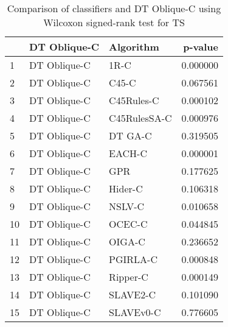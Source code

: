 \begin{table}
\footnotesize
\caption{Comparison of classifiers and DT Oblique-C using Wilcoxon signed-rank test for TS}
\label{tab:DT Oblique-C wilcoxon TS comparison}
\begin{tabular}{lllr}
\hline
 & DT Oblique-C & Algorithm & p-value \\
\hline
1 & DT Oblique-C & 1R-C & 0.000000 \\
2 & DT Oblique-C & C45-C & 0.067561 \\
3 & DT Oblique-C & C45Rules-C & 0.000102 \\
4 & DT Oblique-C & C45RulesSA-C & 0.000976 \\
5 & DT Oblique-C & DT GA-C & 0.319505 \\
6 & DT Oblique-C & EACH-C & 0.000001 \\
7 & DT Oblique-C & GPR & 0.177625 \\
8 & DT Oblique-C & Hider-C & 0.106318 \\
9 & DT Oblique-C & NSLV-C & 0.010658 \\
10 & DT Oblique-C & OCEC-C & 0.044845 \\
11 & DT Oblique-C & OIGA-C & 0.236652 \\
12 & DT Oblique-C & PGIRLA-C & 0.000848 \\
13 & DT Oblique-C & Ripper-C & 0.000149 \\
14 & DT Oblique-C & SLAVE2-C & 0.101090 \\
15 & DT Oblique-C & SLAVEv0-C & 0.776605 \\
\hline
\end{tabular}
\end{table}
